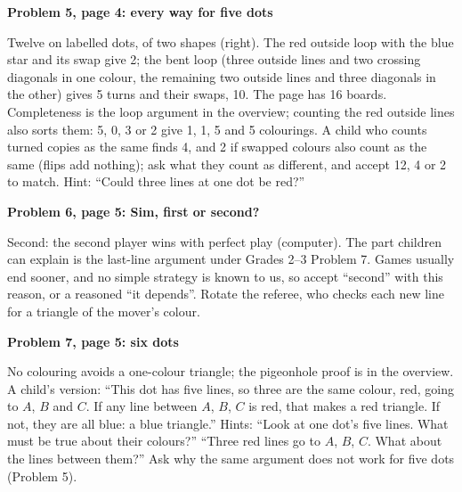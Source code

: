 \documentclass[11pt]{article}
\newcommand{\sub}[1]{\par\needspace{4\baselineskip}\textbf{#1}\par}
\begin{document}
\begin{minipage}[t]{.62\linewidth}
\sub{Problem 5, page 4: every way for five dots}
Twelve on labelled dots, of two shapes (right). The red outside loop with the blue star and its swap give 2; the bent loop (three outside lines and two crossing diagonals in one colour, the remaining two outside lines and three diagonals in the other) gives 5 turns and their swaps, 10. The page has 16 boards. Completeness is the loop argument in the overview; counting the red outside lines also sorts them: 5, 0, 3 or 2 give 1, 1, 5 and 5 colourings. A child who counts turned copies as the same finds 4, and 2 if swapped colours also count as the same (flips add nothing); ask what they count as different, and accept 12, 4 or 2 to match. Hint: ``Could three lines at one dot be red?''
\end{minipage}\hfill
\begin{minipage}[t]{.35\linewidth}\vspace{6pt}\centering\fivefig\end{minipage}\par\smallskip

\sub{Problem 6, page 5: Sim, first or second?}
Second: the second player wins with perfect play (computer). The part children can explain is the last-line argument under Grades 2--3 Problem 7. Games usually end sooner, and no simple strategy is known to us, so accept ``second'' with this reason, or a reasoned ``it depends''. Rotate the referee, who checks each new line for a triangle of the mover's colour.

\sub{Problem 7, page 5: six dots}
No colouring avoids a one-colour triangle; the pigeonhole proof is in the overview. A child's version: ``This dot has five lines, so three are the same colour, red, going to $A$, $B$ and $C$. If any line between $A$, $B$, $C$ is red, that makes a red triangle. If not, they are all blue: a blue triangle.'' Hints: ``Look at one dot's five lines. What must be true about their colours?'' ``Three red lines go to $A$, $B$, $C$. What about the lines between them?'' Ask why the same argument does not work for five dots (Problem 5).
\end{document}
